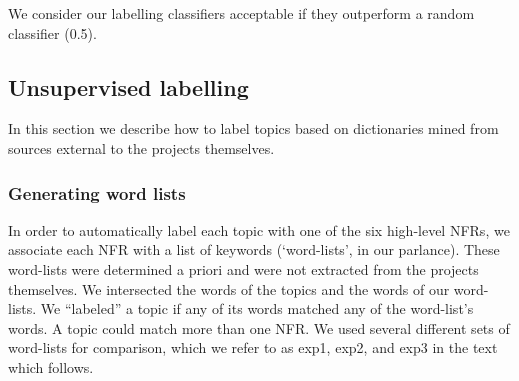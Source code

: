 \documentclass[]{sig-alternate}
\begin{document}
We consider our labelling classifiers acceptable if they outperform a random classifier (0.5). 

\subsection{Unsupervised labelling}
\label{sec:unsuplabelling}

In this section we describe how to label topics based on dictionaries
mined from sources external to the projects themselves.





\subsubsection{Generating word lists}


In order to automatically label each topic with 
one of the six high-level NFRs,
we associate each NFR with a list
of keywords (`word-lists', in our parlance). These word-lists were determined a priori and were not extracted from the projects themselves.
We intersected the words of the topics and the words of our word-lists.
We ``labeled'' a topic if any of its words matched any of the word-list's words.
A topic could match more than one NFR.
We used several different sets of word-lists for comparison, which we
refer to as \textsf{exp1}, \textsf{exp2}, and \textsf{exp3} in the text which follows. 
\end{document}
